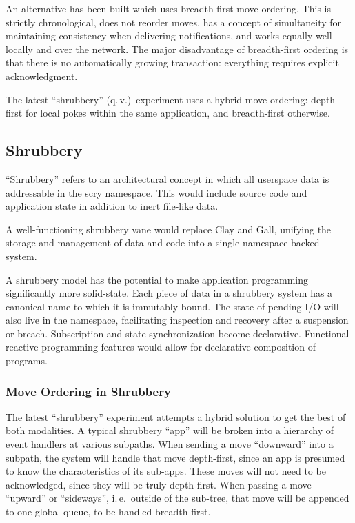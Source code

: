 \documentclass[twoside]{article}
\begin{document}
An alternative has been built which uses breadth-first move ordering.  This is strictly chronological, does not reorder moves, has a concept of simultaneity for maintaining consistency when delivering notifications, and works equally well locally and over the network.  The major disadvantage of breadth-first ordering is that there is no automatically growing transaction: everything requires explicit acknowledgment.

The latest ``shrubbery'' (q.\,v.)\ experiment uses a hybrid move ordering: depth-first for local pokes within the same application, and breadth-first otherwise.

\subsection{Shrubbery}

``Shrubbery'' refers to an architectural concept in which all user\-space data is addressable in the scry namespace.  This would include source code and application state in addition to inert file-like data.

A well-functioning shrubbery vane would replace Clay and Gall, unifying the storage and management of data and code into a single namespace-backed system.

A shrubbery model has the potential to make application programming significantly more solid-state.  Each piece of data in a shrubbery system has a canonical name to which it is immutably bound.  The state of pending I/O will also live in the namespace, facilitating inspection and recovery after a suspension or breach.  Subscription and state synchronization become declarative.  Functional reactive programming features would allow for declarative composition of programs.

\subsubsection{Move Ordering in Shrubbery}

The latest ``shrubbery'' experiment attempts a hybrid solution to get the best of both modalities.  A typical shrubbery ``app'' will be broken into a hierarchy of event handlers at various subpaths.  When sending a move ``downward'' into a subpath, the system will handle that move depth-first, since an app is presumed to know the characteristics of its sub-apps.  These moves will not need to be acknowledged, since they will be truly depth-first.  When passing a move ``upward'' or ``sideways'', i.\,e.\ outside of the sub-tree, that move will be appended to one global queue, to be handled breadth-first.
\end{document}
